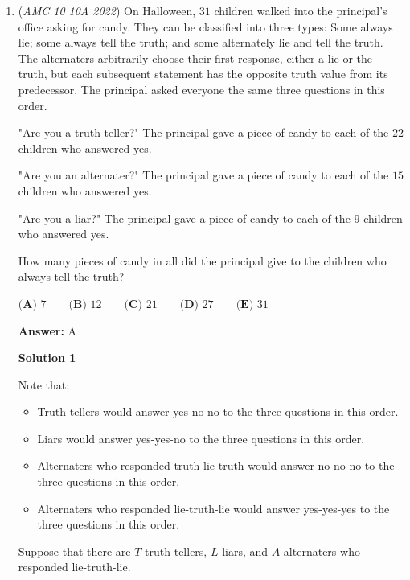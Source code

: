 \begin{enumerate}
	\item (\textit{AMC 10 10A 2022}) On Halloween, $31$ children walked into the principal's office asking for candy. They
can be classified into three types: Some always lie; some always tell the truth; and
some alternately lie and tell the truth. The alternaters arbitrarily choose their first
response, either a lie or the truth, but each subsequent statement has the opposite
truth value from its predecessor. The principal asked everyone the same three
questions in this order.


 "Are you a truth-teller?" The principal gave a piece of candy to each of the $22$
children who answered yes.


 "Are you an alternater?" The principal gave a piece of candy to each of the $15$
children who answered yes.


 "Are you a liar?" The principal gave a piece of candy to each of the $9$ children who
answered yes.


 How many pieces of candy in all did the principal give to the children who always
tell the truth?


 $\textbf{(A) } 7 \qquad \textbf{(B) } 12 \qquad \textbf{(C) } 21 \qquad \textbf{(D) } 27 \qquad \textbf{(E) } 31$

 \textbf{Answer: }A



\textbf{Solution 1}

Note that:

 
            \begin{itemize}
        \item Truth-tellers would answer yes-no-no to the three questions in this order.
            \end{itemize}
            
            \begin{itemize}
        \item Liars would answer yes-yes-no to the three questions in this order.
            \end{itemize}
            
            \begin{itemize}
        \item Alternaters who responded truth-lie-truth would answer no-no-no to the three questions in this order.
            \end{itemize}
            
            \begin{itemize}
        \item Alternaters who responded lie-truth-lie would answer yes-yes-yes to the three questions in this order.
            \end{itemize}
            Suppose that there are $T$ truth-tellers, $L$ liars, and $A$ alternaters who responded lie-truth-lie.


\end{enumerate}
